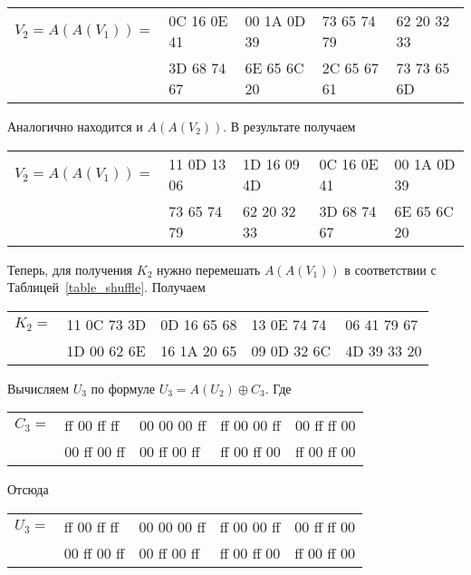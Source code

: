 \documentclass[10pt]{article}
\begin{document}
\begin{center}
  \begin{tabular}{lllll}
    $V_2=A(A(V_1)) =$ & 0C 16 0E 41 & 00 1A 0D 39 & 73 65 74 79 & 62 20 32 33 \\
                      & 3D 68 74 67 & 6E 65 6C 20 & 2C 65 67 61 & 73 73 65 6D \\
  \end{tabular}
\end{center}

Аналогично находится и $A(A(V_2))$. В результате получаем

\begin{center}
  \begin{tabular}{lllll}
    $V_2=A(A(V_1)) =$ & 11 0D 13 06 & 1D 16 09 4D & 0C 16 0E 41 & 00 1A 0D 39 \\
                      & 73 65 74 79 & 62 20 32 33 & 3D 68 74 67 & 6E 65 6C 20 \\
  \end{tabular}
\end{center}

Теперь, для получения $K_2$ нужно перемешать $A(A(V_1))$ в соответствии с Таблицей~\ref{table_shuffle}. Получаем

\begin{center}
  \begin{tabular}{lllll}
    $K_2 =$ & 11 0C 73 3D & 0D 16 65 68 & 13 0E 74 74 & 06 41 79 67 \\
            & 1D 00 62 6E & 16 1A 20 65 & 09 0D 32 6C & 4D 39 33 20 \\
  \end{tabular}
\end{center}

Вычисляем $U_3$ по формуле $U_3 = A(U_2) \oplus C_3$. Где

\begin{center}
  \begin{tabular}{lllll}
    $C_3 =$ & ff 00 ff ff & 00 00 00 ff & ff 00 00 ff & 00 ff ff 00 \\
            & 00 ff 00 ff & 00 ff 00 ff & ff 00 ff 00 & ff 00 ff 00 \\
  \end{tabular}
\end{center}

Отсюда

\begin{center}
  \begin{tabular}{lllll}
    $U_3 =$ & ff 00 ff ff & 00 00 00 ff & ff 00 00 ff & 00 ff ff 00 \\
            & 00 ff 00 ff & 00 ff 00 ff & ff 00 ff 00 & ff 00 ff 00 \\
  \end{tabular}
\end{center}
\end{document}
